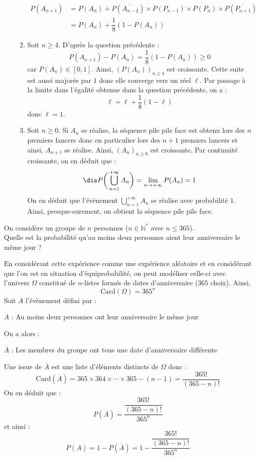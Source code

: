 \documentclass[a4paper,10pt]{report}
\begin{document}
\begin{enumerate}
\begin{enumerate}
\begin{align*}
P(A_{n+1}) & = P(A_n) +   P(\overline{A_{n-2}}) \times P( P_{n-1}) \times P(P_n) \times P(\overline{P_{n+1}}) \\
& = P(A_n) + \dfrac{1}{8} (1-P(A_n))
\end{align*}
\item Soit $n \geq 4$. D'après la question précédente :
$$ P(A_{n+1})-P(A_n)= \dfrac{1}{8} (1-P(A_n)) \geq 0$$
car $P(A_n) \in [0,1]$. Ainsi, $(P(A_n))_{n \geq 4}$ est croissante. Cette suite est aussi majorée par $1$ donc elle converge vers un réel $\ell$. Par passage à la limite dans l'égalité obtenue dans la question précédente, on a :
$$ \ell = \ell + \dfrac{1}{8}(1- \ell)$$
donc $\ell =1$.
\item Soit $n \geq 0$. Si $A_{n}$ se réalise, la séquence pile pile face est obtenu lors des $n$ premiers lancers donc en particulier lors des $n+1$ premiers lancers et ainsi, $A_{n+1}$ se réalise. Ainsi, $(A_n)_{n \geq 0}$ est croissante. Par continuité croissante, on en déduit que :
$$\dis P \bigg{(} \bigcup_{n=1}^{+  \infty} A_n \bigg{)} = \lim_{n \rightarrow + \infty} P(A_n) = 1$$
On en déduit que l'évènement $\bigcup_{n=1}^{+  \infty} A_n $ se réalise avec probabilité $1$. Ainsi, presque-surement, on obtient la séquence pile pile face.
\end{enumerate}
\end{enumerate}

\begin{Exa}
On considère un groupe de $n$ personnes ($n \in \mathbb{N}^*$ avec $n \leq 365$).\\
Quelle est la probabilité qu'au moins deux personnes aient leur anniversaire le même jour ?
\end{Exa}

\corr En considérant cette expérience comme une expérience aléatoire et en considérant que l'on est en situation d'équiprobabilité, on peut modéliser celle-ci avec l'univers $\Omega$ constitué de $n$-listes formés de dates d'anniversaire ($365$ choix). Ainsi,
$$ \textrm{Card}(\Omega) = 365^n$$
Soit $A$ l'évènement défini par :

\begin{center}
$A$ : \og Au moins deux personnes ont leur anniversaire le même jour \fg{} 
\end{center}
On a alors :
\begin{center}
$\overline{A}$ : \og Les membres du groupe ont tous une date d'anniversaire différente \fg{} 
\end{center}
Une issue de $\overline{A}$ est une liste d'éléments distincts de $\Omega$ donc :
$$ \textrm{Card}(\overline{A}) = 365 \times 364 \times \cdots \times 365-(n-1) = \dfrac{365!}{(365-n)!}$$
On en déduit que :
$$ P(\overline{A}) = \dfrac{\dfrac{365!}{(365-n)!}}{365^n}$$
et ainsi :
$$ P(A) = 1- P(\overline{A}) = 1 - \dfrac{\dfrac{365!}{(365-n)!}}{365^n}$$
\end{document}
